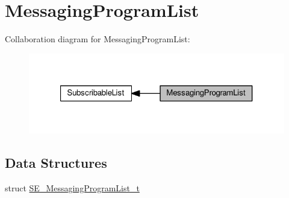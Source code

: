 \hypertarget{group__MessagingProgramList}{}\section{Messaging\+Program\+List}
\label{group__MessagingProgramList}
Collaboration diagram for Messaging\+Program\+List\+:\nopagebreak
\begin{figure}[H]
\begin{center}
\leavevmode
\includegraphics[width=321pt]{group__MessagingProgramList}
\end{center}
\end{figure}
\subsection*{Data Structures}
\begin{DoxyCompactItemize}
\item 
struct \hyperlink{structSE__MessagingProgramList__t}{S\+E\+\_\+\+Messaging\+Program\+List\+\_\+t}
\end{DoxyCompactItemize}
